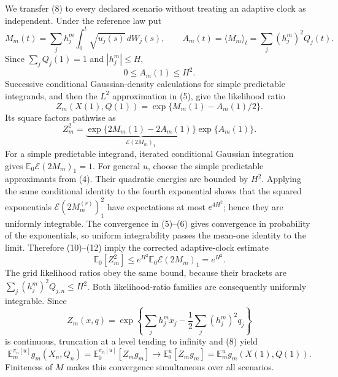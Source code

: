 We transfer (8) to every declared scenario without treating an adaptive clock as independent.  Under the reference law put
\[
 M_m(t)=\sum_jh_j^m\int_0^t\sqrt{u_j(s)}\,dW_j(s),
 \qquad
 A_m(t)=\langle M_m\rangle_t
 =\sum_j(h_j^m)^2Q_j(t).                                         \tag{9}
\]
Since \(\sum_jQ_j(1)=1\) and \(|h_j^m|\leq H\),
\[
 0\leq A_m(1)\leq H^2.                                          \tag{10}
\]
Successive conditional Gaussian-density calculations for simple predictable integrands, and then the \(L^2\) approximation in (5), give the likelihood ratio
\[
 Z_m(X(1),Q(1))=\exp\{M_m(1)-A_m(1)/2\}.                         \tag{11}
\]
Its square factors pathwise as
\[
 Z_m^2=
 \underbrace{\exp\{2M_m(1)-2A_m(1)\}}_{\mathcal E(2M_m)_1}
 \exp\{A_m(1)\}.                                                \tag{12}
\]
For a simple predictable integrand, iterated conditional Gaussian integration gives \(\mathbb E_0\mathcal E(2M_m)_1=1\).  For general \(u\), choose the simple predictable approximants from (4).  Their quadratic energies are bounded by \(H^2\).  Applying the same conditional identity to the fourth exponential shows that the squared exponentials \(\mathcal E(2M_m^{(r)})_1^2\) have expectations at most \(e^{4H^2}\); hence they are uniformly integrable.  The convergence in (5)--(6) gives convergence in probability of the exponentials, so uniform integrability passes the mean-one identity to the limit.  Therefore (10)--(12) imply the corrected adaptive-clock estimate
\[
 \mathbb E_0[Z_m^2]
 \leq e^{H^2}\mathbb E_0\mathcal E(2M_m)_1=e^{H^2}.              \tag{13}
\]
The grid likelihood ratios obey the same bound, because their brackets are \(\sum_j(h_j^m)^2Q_{j,n}\leq H^2\).  Both likelihood-ratio families are consequently uniformly integrable.  Since
\[
 Z_m(x,q)=\exp\!\left\{\sum_jh_j^mx_j-\frac12\sum_j(h_j^m)^2q_j\right\} \tag{14}
\]
is continuous, truncation at a level tending to infinity and (8) yield
\[
 \mathbb E_m^{\pi_n[u]}g_m(X_n,Q_n)
 =\mathbb E_0^{\pi_n[u]}[Z_mg_m]
 \longrightarrow
 \mathbb E_0^u[Z_mg_m]
 =\mathbb E_m^ug_m(X(1),Q(1)).                                   \tag{15}
\]
Finiteness of \(M\) makes this convergence simultaneous over all scenarios.

